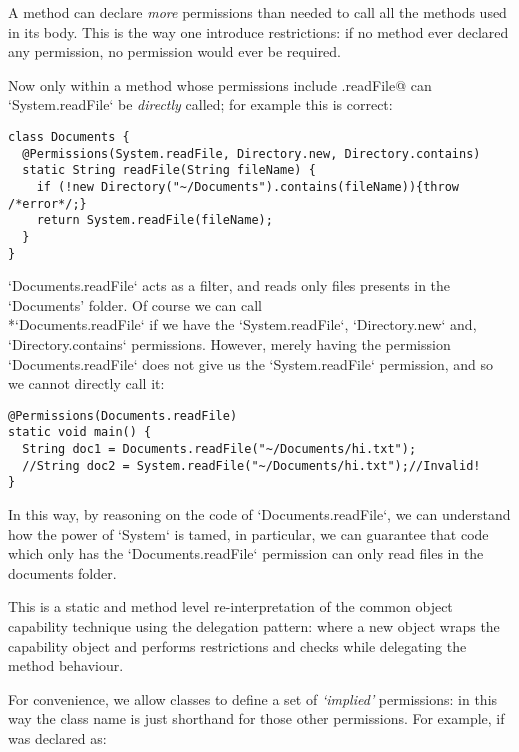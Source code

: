 \documentclass[a4paper,twoside,british,9pt]{extarticle}
\providecommand*{\code}[1]{\Q`#1`}
\begin{document}
A method can declare \textit{more} permissions than needed to call all the methods
used in its body.
This is the way one introduce restrictions: if no method ever declared any permission, no permission
would ever be required.

Now only within a method whose permissions include \Q@System.readFile@
can \code{System.readFile} be \emph{directly} called; for example this
is correct:

\begin{lstlisting}
class Documents {
  @Permissions(System.readFile, Directory.new, Directory.contains)
  static String readFile(String fileName) {
    if (!new Directory("~/Documents").contains(fileName)){throw /*error*/;}
    return System.readFile(fileName);
  }
}
\end{lstlisting}

\code{Documents.readFile} acts as a filter, and reads only files
presents in the `Documents' folder. Of course we can call \\*\code{Documents.readFile}
if we have the \code{System.readFile}, \code{Directory.new} and,
\code{Directory.contains} permissions. However, merely having the
permission \code{Documents.readFile} does not give us the  \code{System.readFile}
permission, and so we cannot directly call it:

\begin{lstlisting}
@Permissions(Documents.readFile)
static void main() {
  String doc1 = Documents.readFile("~/Documents/hi.txt");
  //String doc2 = System.readFile("~/Documents/hi.txt");//Invalid!
}
\end{lstlisting}

In this way, by reasoning on the code of \code{Documents.readFile},
we can understand how the power of \code{System} is tamed, in particular,
we can guarantee that code which  only has the \code{Documents.readFile}
permission can only read files in the documents folder.

This is a static and method level re-interpretation of the common object capability technique
using the delegation pattern: where a new object wraps
the capability object and performs restrictions and checks while delegating the method behaviour.


For convenience, we allow classes to define a set of \emph{`implied'}
permissions: in this way the class name is just shorthand for those
other permissions. For example, if \Q@Directory@ was declared as:
\end{document}
